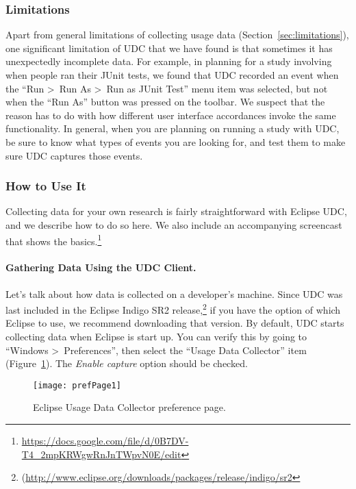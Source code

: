 \subsubsection{Limitations}

Apart from general limitations of collecting usage data (Section~\ref{sec:limitations}),
one significant limitation of UDC that we have found is that sometimes it has
unexpectedly incomplete data.
For example, in planning for a study involving when people ran their JUnit tests,
we found that UDC recorded an event when the ``Run \textgreater~Run As \textgreater~Run as JUnit Test'' menu item was selected,
but not when the ``Run As'' button was pressed on the toolbar.
We suspect that the reason has to do with how different user interface accordances
invoke the same functionality.
In general, when you are planning on running a study with UDC, be sure to know what
types of events you are looking for, and test them to make sure UDC captures those events.

\subsubsection{How to Use It}

Collecting data for your own research is fairly straightforward with Eclipse UDC,
and we describe how to do so here.
We also include an accompanying screencast that shows the 
basics.\footnote{\url{https://docs.google.com/file/d/0B7DV-T4_2mpKRWgwRnJnTWpvN0E/edit}}

\paragraph{Gathering Data Using the UDC Client.}

Let's talk about how data is collected on a developer's machine.
Since UDC was last included in the Eclipse Indigo SR2 
release,\footnote{(\url{http://www.eclipse.org/downloads/packages/release/indigo/sr2}}
if you have the option of which Eclipse to use, we recommend downloading
that version.
By default, UDC starts collecting data when Eclipse is start up.
You can verify this by going to ``Windows \textgreater~Preferences'', then
select the ``Usage Data Collector'' item (Figure~\ref{fig:prefPage1}).
The \textit{Enable capture} option should be checked.

\begin{figure}
  \centering
  \texttt{[image: prefPage1]}
  \caption{Eclipse Usage Data Collector preference page.}\label{fig:prefPage1}
\end{figure}

